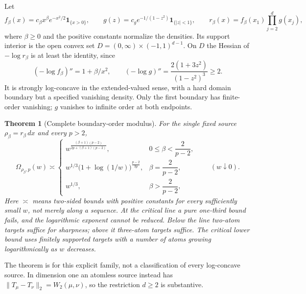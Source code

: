 \documentclass[11pt]{article}
\newtheorem{theorem}{Theorem}[section]
\theoremstyle{remark}\newtheorem{remark}[theorem]{Remark}
\newcommand{\ind}{\mathbf 1}\newcommand{\norm}[1]{\lVert#1\rVert}
\begin{document}
Let
\begin{equation}\label{eq:source}
 f_\beta(x)=c_\beta x^\beta e^{-x^2/2}\ind_{\{x>0\}},\qquad
 g(z)=c_g e^{-1/(1-z^2)}\ind_{\{|z|<1\}},\qquad
 r_\beta(x)=f_\beta(x_1)\prod_{j=2}^d g(x_j),
\end{equation}
where $\beta\ge0$ and the positive constants normalize the densities. Its support interior is the open convex set
$D=(0,\infty)\times(-1,1)^{d-1}$. On $D$ the Hessian of $-\log r_\beta$ is at least the identity, since
\[
 (-\log f_\beta)''=1+\beta/x^2,\qquad
 (-\log g)''=\frac{2(1+3z^2)}{(1-z^2)^3}\ge2.
\]
It is strongly log-concave in the extended-valued sense, with a hard domain boundary but a specified vanishing density. Only the first boundary has finite-order vanishing; $g$ vanishes to infinite order at both endpoints.

\begin{theorem}[Complete boundary-order modulus]\label{thm:phase}
For the single fixed source $\rho_\beta=r_\beta\,dx$ and every $p>2$,
\begin{equation}\label{eq:phase}
 \boxed{\quad\Omega_{\rho_\beta,p}(w)\asymp
 \begin{cases}
 w^{\frac{(\beta+1)(p-2)}{2p+(\beta+1)(p-2)}},
       &0\le\beta<\dfrac{2}{p-2},\\[2mm]
 w^{1/3}\bigl(1+\log(1/w)\bigr)^{\frac{p-2}{3p}},
       &\beta=\dfrac{2}{p-2},\\[2mm]
 w^{1/3},&\beta>\dfrac{2}{p-2},
 \end{cases}\qquad(w\downarrow0).\quad}
\end{equation}
Here $\asymp$ means two-sided bounds with positive constants for every sufficiently small $w$, not merely along a sequence. At the critical line a pure one-third bound fails, and the logarithmic exponent cannot be reduced. Below the line two-atom targets suffice for sharpness; above it three-atom targets suffice. The critical lower bound uses finitely supported targets with a number of atoms growing logarithmically as $w$ decreases.
\end{theorem}

The theorem is for this explicit family, not a classification of every log-concave source. In dimension one an atomless source instead has $\norm{T_\mu-T_\nu}_2=W_2(\mu,\nu)$, so the restriction $d\ge2$ is substantive.
\end{document}
